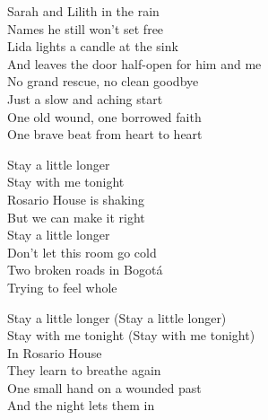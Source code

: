 \begin{lyrics}
Sarah and Lilith in the rain\\
Names he still won’t set free\\
Lida lights a candle at the sink\\
And leaves the door half-open for him and me\\
No grand rescue, no clean goodbye\\
Just a slow and aching start\\
One old wound, one borrowed faith\\
One brave beat from heart to heart

Stay a little longer\\
Stay with me tonight\\
Rosario House is shaking\\
But we can make it right\\
Stay a little longer\\
Don’t let this room go cold\\
Two broken roads in Bogotá\\
Trying to feel whole

Stay a little longer
(Stay a little longer)\\
Stay with me tonight
(Stay with me tonight)\\
In Rosario House\\
They learn to breathe again\\
One small hand on a wounded past\\
And the night lets them in
\end{lyrics}

